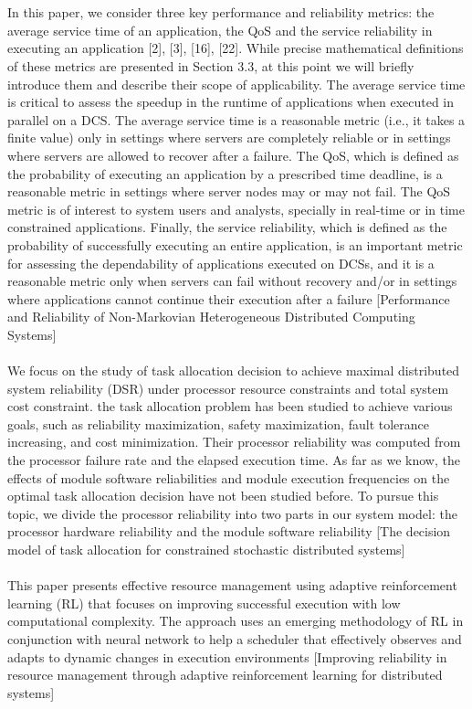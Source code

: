 \documentclass{cslthse-msc}
\begin{document}
\\\\
In this paper, we consider three key performance and reliability metrics: the average service time of an application, the QoS and the service reliability in executing an application [2], [3], [16], [22]. While precise mathematical definitions of these metrics are presented in Section 3.3, at this point we will briefly introduce them and describe their scope of applicability. The average service time is critical to assess the speedup in the runtime of applications when executed in parallel on a DCS. The average service time is a reasonable metric (i.e., it takes a finite value) only in settings where servers are completely reliable or in settings where servers are allowed to recover after a failure. The QoS, which is defined as the probability of executing an application by a prescribed time deadline, is a reasonable metric in settings where server nodes may or may not fail. The QoS metric is of interest to system users and analysts, specially in real-time or in time constrained applications. Finally, the service reliability, which is defined as the probability of successfully executing an entire application, is an important metric for assessing the dependability of applications executed on DCSs, and it is a reasonable metric only when servers can fail without recovery and/or in settings where applications cannot continue their execution after a failure [Performance and Reliability of Non-Markovian Heterogeneous Distributed Computing Systems]
\\\\
We focus on the study of task allocation decision to achieve maximal distributed system reliability (DSR) under processor resource constraints and total system cost constraint. the task allocation problem has been studied to achieve various goals, such as reliability maximization, safety maximization, fault tolerance increasing, and cost minimization. Their processor reliability was computed from the processor failure rate and the elapsed execution time. As far as we know, the effects of module software reliabilities and module execution frequencies on the optimal task allocation decision have not been studied before. To pursue this topic, we divide the processor reliability into two parts in our system model: the processor hardware reliability and the module software reliability [The decision model of task allocation for constrained stochastic distributed systems]
\\\\
This paper presents effective resource management using adaptive reinforcement learning (RL) that focuses on improving successful execution with low computational complexity. The approach uses an emerging methodology of RL in conjunction with neural network to help a scheduler that effectively observes and adapts to dynamic changes in execution environments [Improving reliability in resource management through adaptive reinforcement learning for distributed systems]
\end{document}
